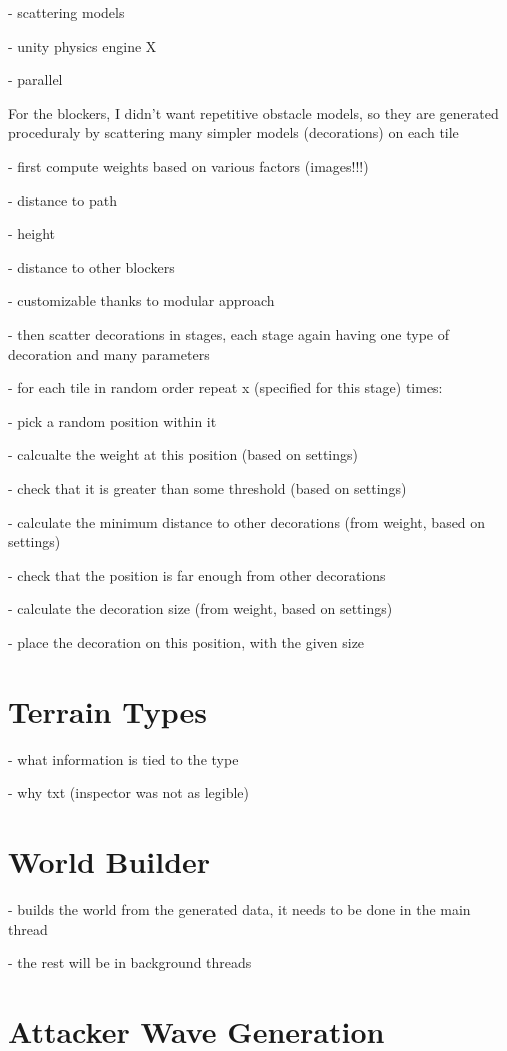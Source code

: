 - scattering models

- unity physics engine X

- parallel

For the blockers, I didn't want repetitive obstacle models, so they are generated proceduraly by scattering many simpler models (decorations) on each tile

- first compute weights based on various factors (images!!!)

- distance to path

- height

- distance to other blockers

- customizable thanks to modular approach

- then scatter decorations in stages, each stage again having one type of decoration and many parameters

- for each tile in random order repeat x (specified for this stage) times:

- pick a random position within it

- calcualte the weight at this position (based on settings)

- check that it is greater than some threshold (based on settings)

- calculate the minimum distance to other decorations (from weight, based on settings)

- check that the position is far enough from other decorations

- calculate the decoration size (from weight, based on settings)

- place the decoration on this position, with the given size

\section{Terrain Types}

- what information is tied to the type

- why txt (inspector was not as legible)

\section{World Builder}

- builds the world from the generated data, it needs to be done in the main thread

- the rest will be in background threads

\section{Attacker Wave Generation}\label{sec:analysis-waves}

